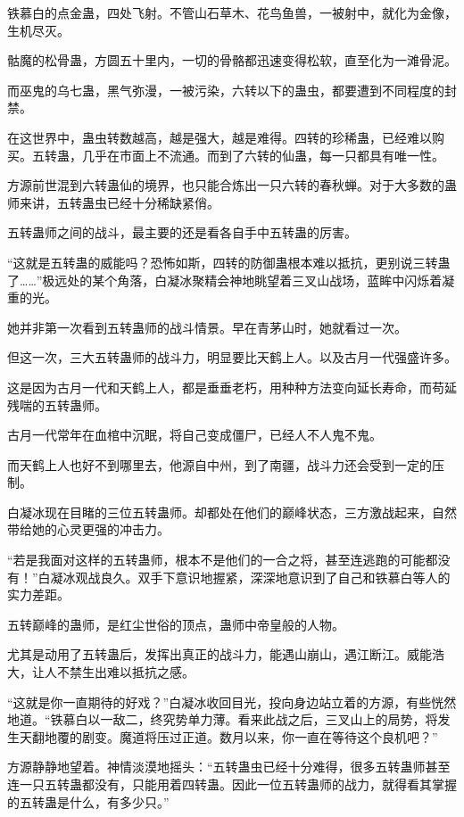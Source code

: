 \begin{this_body}
铁慕白的点金蛊，四处飞射。不管山石草木、花鸟鱼兽，一被射中，就化为金像，生机尽灭。

骷魔的松骨蛊，方圆五十里内，一切的骨骼都迅速变得松软，直至化为一滩骨泥。

而巫鬼的乌七蛊，黑气弥漫，一被污染，六转以下的蛊虫，都要遭到不同程度的封禁。

在这世界中，蛊虫转数越高，越是强大，越是难得。四转的珍稀蛊，已经难以购买。五转蛊，几乎在市面上不流通。而到了六转的仙蛊，每一只都具有唯一性。

方源前世混到六转蛊仙的境界，也只能合炼出一只六转的春秋蝉。对于大多数的蛊师来讲，五转蛊虫已经十分稀缺紧俏。

五转蛊师之间的战斗，最主要的还是看各自手中五转蛊的厉害。

“这就是五转蛊的威能吗？恐怖如斯，四转的防御蛊根本难以抵抗，更别说三转蛊了……”极远处的某个角落，白凝冰聚精会神地眺望着三叉山战场，蓝眸中闪烁着凝重的光。

她并非第一次看到五转蛊师的战斗情景。早在青茅山时，她就看过一次。

但这一次，三大五转蛊师的战斗力，明显要比天鹤上人。以及古月一代强盛许多。

这是因为古月一代和天鹤上人，都是垂垂老朽，用种种方法变向延长寿命，而苟延残喘的五转蛊师。

古月一代常年在血棺中沉眠，将自己变成僵尸，已经人不人鬼不鬼。

而天鹤上人也好不到哪里去，他源自中州，到了南疆，战斗力还会受到一定的压制。

白凝冰现在目睹的三位五转蛊师。却都处在他们的巅峰状态，三方激战起来，自然带给她的心灵更强的冲击力。

“若是我面对这样的五转蛊师，根本不是他们的一合之将，甚至连逃跑的可能都没有！”白凝冰观战良久。双手下意识地握紧，深深地意识到了自己和铁慕白等人的实力差距。

五转巅峰的蛊师，是红尘世俗的顶点，蛊师中帝皇般的人物。

尤其是动用了五转蛊后，发挥出真正的战斗力，能遇山崩山，遇江断江。威能浩大，让人不禁生出难以抵抗之感。

“这就是你一直期待的好戏？”白凝冰收回目光，投向身边站立着的方源，有些恍然地道。“铁慕白以一敌二，终究势单力薄。看来此战之后，三叉山上的局势，将发生天翻地覆的剧变。魔道将压过正道。数月以来，你一直在等待这个良机吧？”

方源静静地望着。神情淡漠地摇头：“五转蛊虫已经十分难得，很多五转蛊师甚至连一只五转蛊都没有，只能用着四转蛊。因此一位五转蛊师的战力，就得看其掌握的五转蛊是什么，有多少只。”


\end{this_body}
